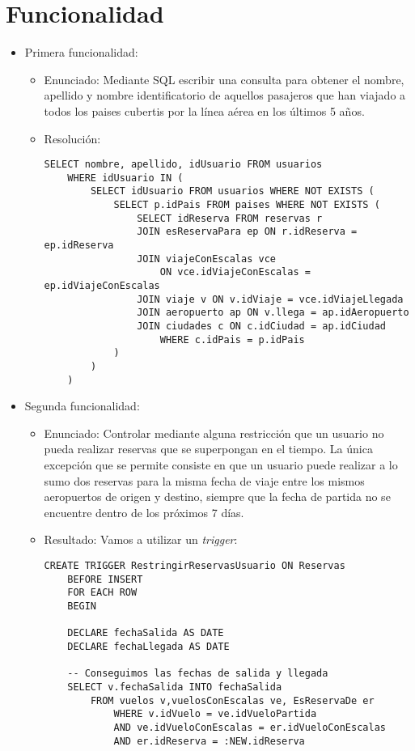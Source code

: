 \section{Funcionalidad}

\begin{itemize}
	\item Primera funcionalidad:
		\begin{itemize}
			\item Enunciado: Mediante SQL escribir una consulta para obtener el nombre, apellido y nombre
			identificatorio de aquellos pasajeros que han viajado a todos los paises cubertis por la l\'inea
			a\'erea en los \'ultimos 5 a\~nos.

			\item Resoluci\'on:

			\begin{lstlisting}
SELECT nombre, apellido, idUsuario FROM usuarios
	WHERE idUsuario IN (
		SELECT idUsuario FROM usuarios WHERE NOT EXISTS (
			SELECT p.idPais FROM paises WHERE NOT EXISTS (
				SELECT idReserva FROM reservas r
				JOIN esReservaPara ep ON r.idReserva = ep.idReserva
				JOIN viajeConEscalas vce 
					ON vce.idViajeConEscalas = ep.idViajeConEscalas
				JOIN viaje v ON v.idViaje = vce.idViajeLlegada
				JOIN aeropuerto ap ON v.llega = ap.idAeropuerto
				JOIN ciudades c ON c.idCiudad = ap.idCiudad
					WHERE c.idPais = p.idPais
			)
		)
	)
			\end{lstlisting}
		\end{itemize}
	\item Segunda funcionalidad:
		\begin{itemize}
			\item Enunciado: Controlar mediante alguna restricci\'on que un usuario no pueda realizar
			reservas que se superpongan en el tiempo. La \'unica excepci\'on que se permite consiste en
			que un usuario puede realizar a lo sumo dos reservas para la misma fecha de viaje entre los
			mismos aeropuertos de origen y destino, siempre que la fecha de partida no se encuentre dentro
			de los pr\'oximos 7 d\'ias.
			\item Resultado: Vamos a utilizar un \textit{trigger}:

			\begin{lstlisting}
CREATE TRIGGER RestringirReservasUsuario ON Reservas
	BEFORE INSERT
	FOR EACH ROW
	BEGIN

	DECLARE fechaSalida AS DATE
	DECLARE fechaLlegada AS DATE
					
	-- Conseguimos las fechas de salida y llegada
	SELECT v.fechaSalida INTO fechaSalida 
		FROM vuelos v,vuelosConEscalas ve, EsReservaDe er
			WHERE v.idVuelo = ve.idVueloPartida
			AND ve.idVueloConEscalas = er.idVueloConEscalas
			AND er.idReserva = :NEW.idReserva


\end{lstlisting}
\end{itemize}
\end{itemize}
